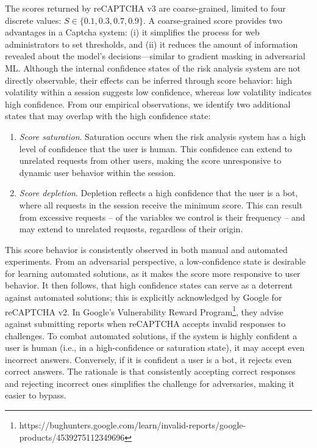 The scores returned by reCAPTCHA v3 are coarse-grained, limited to four discrete values: $S \in \{0.1, 0.3, 0.7, 0.9\}$.
A coarse-grained score provides two advantages in a Captcha system: (i) it simplifies the process for web administrators to set thresholds, and (ii) it reduces the amount of information revealed about the model’s decisions—similar to gradient masking in adversarial \gls{ML}.
Although the internal confidence states of the risk analysis system are not directly observable, their effects can be inferred through score behavior: high volatility within a session suggests low confidence, whereas low volatility indicates high confidence.
From our empirical observations, we identify two additional states that may overlap with the high confidence state:

\begin{enumerate}
\item \emph{Score saturation}. Saturation occurs when the risk analysis system has a high level of confidence that the user is human.
This confidence can extend to unrelated requests from other users, making the score unresponsive to dynamic user behavior within the session.
\item \emph{Score depletion}.
Depletion reflects a high confidence that the user is a bot, where all requests in the session receive the minimum score. This can result from excessive requests -- of the variables we control is their frequency -- and may extend to unrelated requests, regardless of their origin.
\end{enumerate}

This score behavior is consistently observed in both manual and automated experiments.
From an adversarial perspective, a low-confidence state is desirable for learning automated solutions, as it makes the score more responsive to user behavior.
It then follows, that high confidence states can serve as a deterrent against automated solutions; this is explicitly acknowledged by Google for reCAPTCHA v2.
In Google's Vulnerability Reward Program\footnote{https://bughunters.google.com/learn/invalid-reports/google-products/4539275112349696}, they advise against submitting reports when reCAPTCHA accepts invalid responses to challenges.
To combat automated solutions, if the system is highly confident a user is human (i.e., in a high-confidence or saturation state), it may accept even incorrect answers.
Conversely, if it is confident a user is a bot, it rejects even correct answers.
The rationale is that consistently accepting correct responses and rejecting incorrect ones simplifies the challenge for adversaries, making it easier to bypass.

